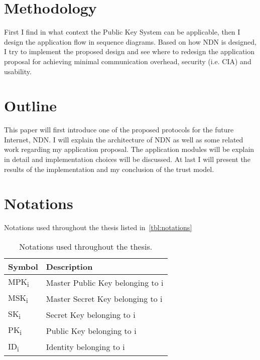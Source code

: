 \section{Methodology}

First I find in what context the Public Key System can be applicable, then I design the application flow in sequence diagrams.
Based on how \gls{NDN} is designed, I try to implement the proposed design and see where to redesign the application proposal for achieving minimal communication overhead, security (i.e. \gls{CIA}) and usability.

\section{Outline}

This paper will first introduce one of the proposed protocols for the future Internet, \gls{NDN}.
I will explain the architecture of \gls{NDN} as well as some related work regarding my application proposal. 
The application modules will be explain in detail and implementation choices will be discussed.
At last I will present the results of the implementation and my conclusion of the trust model.

\section{Notations}
Notations used throughout the thesis listed in~\autoref{tbl:notations}
\begin{table}[h]
  \begin{tabular}[c]{p{}p{}}
  \hline
  Symbol                    & Description                           \\ \hline
  MPK\textsubscript{i}      & Master Public Key belonging to i      \\ %
  MSK\textsubscript{i}      & Master Secret Key belonging to i      \\ %
  SK\textsubscript{i}       & Secret Key belonging to i             \\ %
  PK\textsubscript{i}       & Public Key belonging to i             \\ %
  ID\textsubscript{i}       & Identity belonging to i               \\ %
  \end{tabular}
  \caption{Notations used throughout the thesis.}
  \label{tbl:notations}
\end{table}